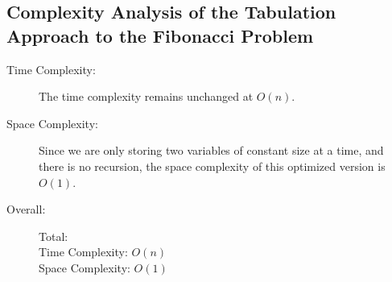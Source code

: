 \subsection{Complexity Analysis of the Tabulation Approach to the Fibonacci Problem}

\begin{description}
    \item[Time Complexity:]
        The time complexity remains unchanged at $O(n)$.

    \item[Space Complexity:] 
        Since we are only storing two variables of constant size at a time,
        and there is no recursion, the space complexity of this optimized version is $O(1)$.

    \item[Overall:] Total:\\
        Time Complexity: $O(n)$\\
        Space Complexity: $O(1)$
        
\end{description}
\newpage

